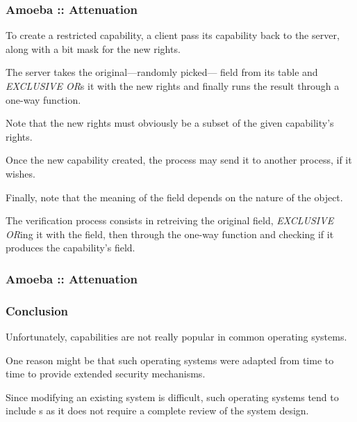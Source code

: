 
\begin{frame}
  \frametitle{Amoeba :: Attenuation}

  To create a restricted capability, a client pass its capability back to the
  server, along with a bit mask for the new rights.

  \-

  The server takes the original---randomly picked--- field from
  its table and \textit{EXCLUSIVE OR}s it with the new rights and finally
  runs the result through a one-way function.

  \-

  Note that the new rights must obviously be a subset of the given
  capability's rights.

  \-

  Once the new capability created, the process may send it to another process,
  if it wishes.

  \-

  Finally, note that the meaning of the  field depends on the
  nature of the object.

  \-

  The verification process consists in retreiving the original 
  field, \textit{EXCLUSIVE OR}ing it with the  field, then
  through the one-way function and checking if it produces the capability's
   field.
\end{frame}


\begin{frame}
  \frametitle{Amoeba :: Attenuation}

  \begin{center}
  \end{center}
\end{frame}


\begin{frame}
  \frametitle{Conclusion}

  Unfortunately, capabilities are not really popular in common operating
  systems.

  \-

  One reason might be that such operating systems were adapted from time
  to time to provide extended security mechanisms.

  \-

  Since modifying an existing system is difficult, such operating systems
  tend to include s as it does not require a complete review of the
  system design.
\end{frame}

